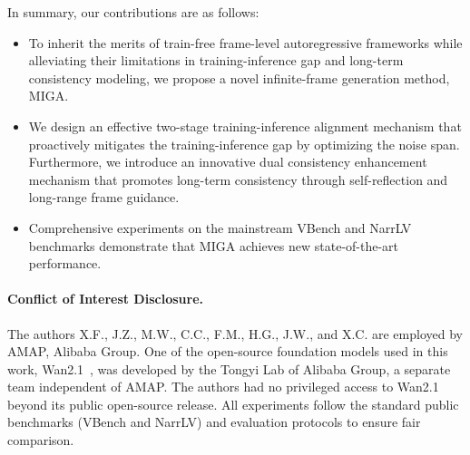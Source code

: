 \documentclass{article}
\theoremstyle{plain}
\theoremstyle{definition}
\theoremstyle{remark}
\begin{document}
In summary, our contributions are as follows:
\begin{itemize}
    \item To inherit the merits of train-free frame-level autoregressive frameworks while alleviating their limitations in training-inference gap and long-term consistency modeling, we propose a novel infinite-frame generation method, MIGA.
    \item We design an effective two-stage training-inference alignment mechanism that proactively mitigates the training-inference gap by optimizing the noise span. Furthermore, we introduce an innovative dual consistency enhancement mechanism that promotes long-term consistency through self-reflection and long-range frame guidance.
    \item  Comprehensive experiments on the mainstream VBench and NarrLV benchmarks demonstrate that MIGA achieves new state-of-the-art performance.
\end{itemize}


\paragraph{Conflict of Interest Disclosure.}
The authors X.F., J.Z., M.W., C.C., F.M., H.G., J.W., and X.C. are employed by AMAP, Alibaba Group. One of the open-source foundation
models used in this work, Wan2.1~\citep{wan2025wan}, was developed by the Tongyi Lab of Alibaba Group, a separate team independent of
AMAP. The authors had no privileged access to Wan2.1 beyond its public
  open-source release. All experiments follow the standard public benchmarks (VBench and NarrLV) and evaluation protocols to ensure fair comparison.
\end{document}
